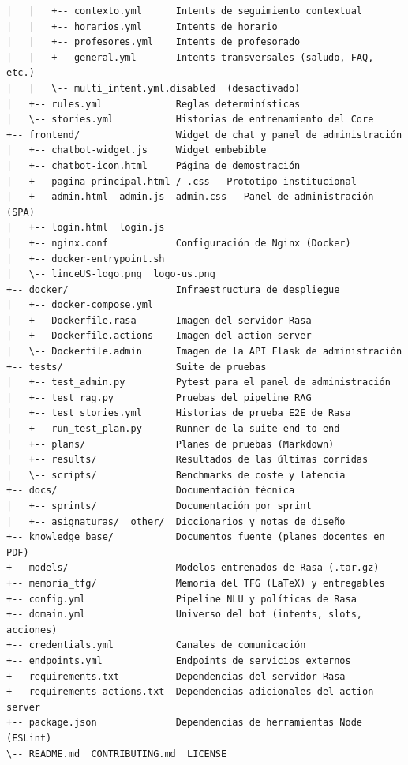 \begin{verbatim}
|   |   +-- contexto.yml      Intents de seguimiento contextual
|   |   +-- horarios.yml      Intents de horario
|   |   +-- profesores.yml    Intents de profesorado
|   |   +-- general.yml       Intents transversales (saludo, FAQ, etc.)
|   |   \-- multi_intent.yml.disabled  (desactivado)
|   +-- rules.yml             Reglas determinísticas
|   \-- stories.yml           Historias de entrenamiento del Core
+-- frontend/                 Widget de chat y panel de administración
|   +-- chatbot-widget.js     Widget embebible
|   +-- chatbot-icon.html     Página de demostración
|   +-- pagina-principal.html / .css   Prototipo institucional
|   +-- admin.html  admin.js  admin.css   Panel de administración (SPA)
|   +-- login.html  login.js
|   +-- nginx.conf            Configuración de Nginx (Docker)
|   +-- docker-entrypoint.sh
|   \-- linceUS-logo.png  logo-us.png
+-- docker/                   Infraestructura de despliegue
|   +-- docker-compose.yml
|   +-- Dockerfile.rasa       Imagen del servidor Rasa
|   +-- Dockerfile.actions    Imagen del action server
|   \-- Dockerfile.admin      Imagen de la API Flask de administración
+-- tests/                    Suite de pruebas
|   +-- test_admin.py         Pytest para el panel de administración
|   +-- test_rag.py           Pruebas del pipeline RAG
|   +-- test_stories.yml      Historias de prueba E2E de Rasa
|   +-- run_test_plan.py      Runner de la suite end-to-end
|   +-- plans/                Planes de pruebas (Markdown)
|   +-- results/              Resultados de las últimas corridas
|   \-- scripts/              Benchmarks de coste y latencia
+-- docs/                     Documentación técnica
|   +-- sprints/              Documentación por sprint
|   +-- asignaturas/  other/  Diccionarios y notas de diseño
+-- knowledge_base/           Documentos fuente (planes docentes en PDF)
+-- models/                   Modelos entrenados de Rasa (.tar.gz)
+-- memoria_tfg/              Memoria del TFG (LaTeX) y entregables
+-- config.yml                Pipeline NLU y políticas de Rasa
+-- domain.yml                Universo del bot (intents, slots, acciones)
+-- credentials.yml           Canales de comunicación
+-- endpoints.yml             Endpoints de servicios externos
+-- requirements.txt          Dependencias del servidor Rasa
+-- requirements-actions.txt  Dependencias adicionales del action server
+-- package.json              Dependencias de herramientas Node (ESLint)
\-- README.md  CONTRIBUTING.md  LICENSE
\end{verbatim}
\endgroup

